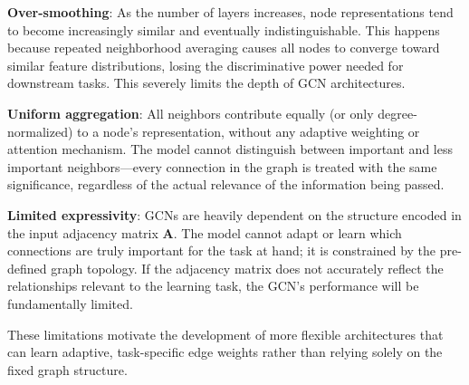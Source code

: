 \begin{compactitemize}
\item \textbf{Over-smoothing}: As the number of layers increases, node representations tend to become increasingly similar and eventually indistinguishable. This happens because repeated neighborhood averaging causes all nodes to converge toward similar feature distributions, losing the discriminative power needed for downstream tasks. This severely limits the depth of GCN architectures.

\item \textbf{Uniform aggregation}: All neighbors contribute equally (or only degree-normalized) to a node's representation, without any adaptive weighting or attention mechanism. The model cannot distinguish between important and less important neighbors—every connection in the graph is treated with the same significance, regardless of the actual relevance of the information being passed.

\item \textbf{Limited expressivity}: GCNs are heavily dependent on the structure encoded in the input adjacency matrix $\mathbf{A}$. The model cannot adapt or learn which connections are truly important for the task at hand; it is constrained by the pre-defined graph topology. If the adjacency matrix does not accurately reflect the relationships relevant to the learning task, the GCN's performance will be fundamentally limited.
\end{compactitemize}

These limitations motivate the development of more flexible architectures that can learn adaptive, task-specific edge weights rather than relying solely on the fixed graph structure.

